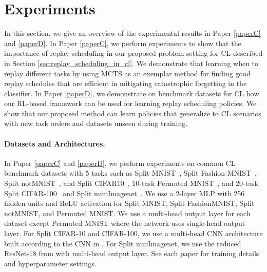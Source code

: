 \section{Experiments}\label{chap4:sec:experiments}

In this section, we give an overview of the experimental results in Paper \ref{paperC} and \ref{paperD}. In Paper \ref{paperC}, we perform experiments to show that the importance of replay scheduling in our proposed problem setting for CL described in Section \ref{sec:replay_scheduling_in_cl}. We demonstrate that learning when to replay different tasks by using MCTS as an exemplar method for finding good replay schedules that are efficient in mitigating catastrophic forgetting in the classifier. In Paper \ref{paperD}, we demonstrate on benchmark datasets for CL how our RL-based framework can be used for learning replay scheduling policies. We show that our proposed method can learn policies that generalize to CL scenarios with new task orders and datasets unseen during training.  

\vspace{-3mm}
\paragraph{Datasets and Architectures.} In Paper \ref{paperC} and \ref{paperD}, we perform experiments on common CL benchmark datasets with 5 tasks such as Split MNIST~\cite{zenke2017continual}, Split Fashion-MNIST~\cite{xiao2017fashion}, Split notMNIST~\cite{bulatov2011notMNIST}, and Split CIFAR10~\cite{krizhevsky2009learning}, 10-task Permuted MNIST~\cite{goodfellow2013empirical}, and 20-task Split CIFAR-100~\cite{krizhevsky2009learning, lopez2017gradient, rebuffi2017icarl} and Split miniImagenet~\cite{vinyals2016matching}. We use a 2-layer MLP with 256 hidden units and ReLU activation for Split MNIST, Split FashionMNIST, Split notMNIST, and Permuted MNIST. We use a multi-head output layer for each dataset except Permuted MNIST where the network uses single-head output layer. For Split CIFAR-10 and CIFAR-100, we use a multi-head CNN architecture built according to the CNN in \cite{adel2019continual, schwarz2018progress, vinyals2016matching}. For Split mniImagenet, we use the reduced ResNet-18 from \cite{lopez2017gradient} with multi-head output layer. See each paper for training details and hyperparameter settings. 



\vspace{-3mm}
